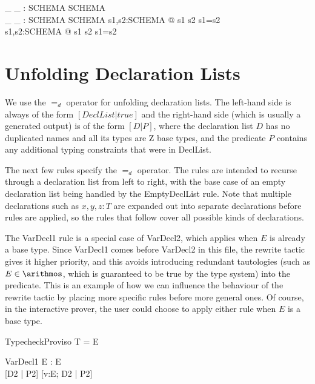 \documentclass{article}
\newcommand{\sexprUnfoldsTo}{\mathrel{=_{se}}}
\newcommand{\declListUnfoldsTo}{\mathrel{=_d}}
\begin{document}
\begin{gendef}[SCHEMA]
  \_ \sexprUnfoldsTo \_ : SCHEMA \rel SCHEMA \\
  \_ \declListUnfoldsTo \_ : SCHEMA \rel SCHEMA
\where
  \forall s1,s2:SCHEMA @ s1 \sexprUnfoldsTo s2 \iff s1=s2 \\
  \forall s1,s2:SCHEMA @ s1 \declListUnfoldsTo s2 \iff s1=s2 \\
\end{gendef}


\section{Unfolding Declaration Lists}

We use the $\declListUnfoldsTo$ operator for unfolding declaration
lists.   The left-hand side is always of the form $[DeclList|true]$
and the right-hand side (which is usually a generated output) is
of the form $[D|P]$, where the declaration list $D$ has no duplicated
names and all its types are Z base types, and the predicate $P$
contains any additional typing constraints that were in DeclList.

The next few rules specify the $\declListUnfoldsTo$ operator.
The rules are intended to recurse through a declaration list from left
to right, with the base case of an empty declaration list being handled
by the EmptyDeclList rule.  Note that multiple declarations such as
$x,y,z:T$ are expanded out into separate declarations before rules
are applied, so the rules that follow cover all possible kinds
of declarations.

The VarDecl1 rule is a special case of VarDecl2, which applies when $E$ is
already a base type.  Since VarDecl1 comes before VarDecl2 in this file,
the rewrite tactic gives it higher priority, and this avoids introducing
redundant tautologies (such as $E \in \arithmos$, which is guaranteed to
be true by the type system) into the predicate.  This is an example of
how we can influence the behaviour of the rewrite tactic by placing more
specific rules before more general ones.  Of course, in the interactive
prover, the user could choose to apply either rule when $E$ is a base type.

\begin{zedproviso}{TypecheckProviso}
  T = \typeOf E
\end{zedproviso}

\begin{zedrule}{VarDecl1}
   \proviso E : \power E \\
   [D1 | true] \declListUnfoldsTo [D2 | P2]
\derives
   [v:E; D1 | true] \declListUnfoldsTo [v:E; D2 |  P2]
\end{zedrule}
\end{document}
